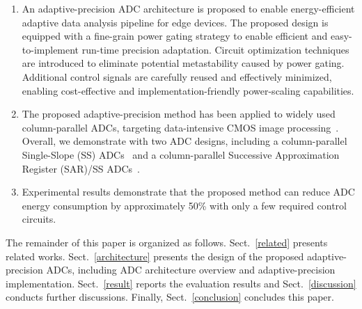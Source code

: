 \begin{enumerate}[\IEEEsetlabelwidth{3)}]
\item 
An adaptive-precision ADC architecture is proposed to enable energy-efficient adaptive data analysis pipeline for edge devices. 
The proposed design is equipped with a fine-grain power gating strategy to enable efficient and easy-to-implement run-time precision adaptation.
Circuit optimization techniques are introduced to eliminate potential metastability caused by power gating. 
Additional control signals are carefully reused and effectively minimized, enabling cost-effective and implementation-friendly power-scaling 
capabilities.  
\item 
The proposed adaptive-precision method has been applied to widely used column-parallel ADCs, targeting data-intensive CMOS image 
processing~\cite{kim_11-bit_2021,nie_single_2020,kumagai_14-inch_2018,park_640_2020}. Overall, we demonstrate with two ADC designs, including 
a column-parallel Single-Slope (SS) ADCs~\cite{snoeij_18v_2005,kleinfelder_10000_2001} and a column-parallel Successive Approximation Register (SAR)/SS ADCs~\cite{kim_area-efficient_2016}. 


	\item 
	Experimental results demonstrate that the proposed method can reduce ADC energy consumption by approximately 50\% with only a few required control circuits.

\end{enumerate} 

The remainder of this paper is organized as follows. 
Sect.~\ref{related} presents related works.
Sect.~\ref{architecture} presents the design of the proposed adaptive-precision ADCs, including ADC architecture overview and adaptive-precision implementation. 
Sect.~\ref{result} reports the evaluation results and Sect.~\ref{discussion} conducts further discussions. 
Finally, Sect.~\ref{conclusion} concludes this paper.
